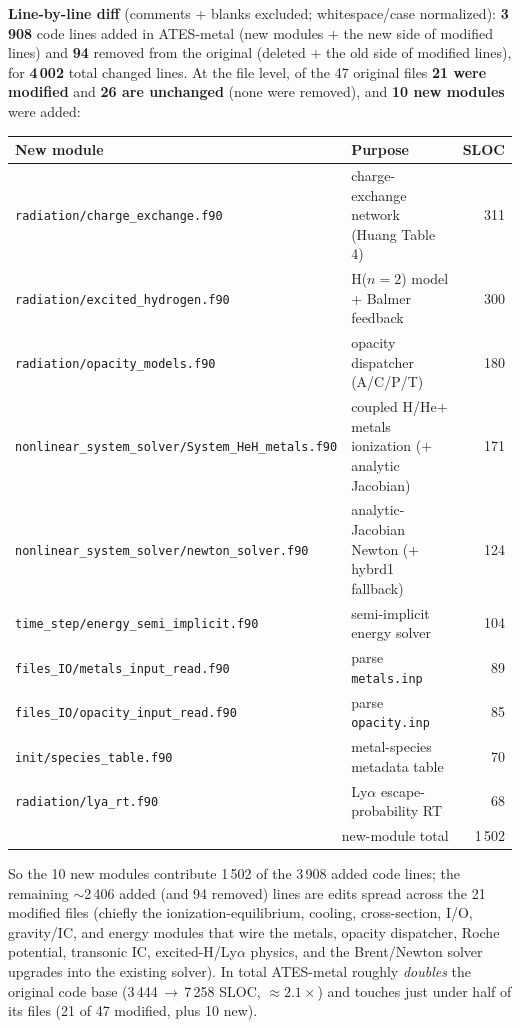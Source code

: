 \documentclass[english,a4paper]{kiseon_memo}
\begin{document}
\noindent
\textbf{Line-by-line diff} (comments + blanks excluded; whitespace/case normalized):
\textbf{3\,908} code lines added in ATES-metal (new modules + the new side of
modified lines) and \textbf{94} removed from the original (deleted + the old side of
modified lines), for \textbf{4\,002} total changed lines. At the file level, of the
47 original files \textbf{21 were modified} and \textbf{26 are unchanged} (none were
removed), and \textbf{10 new modules} were added:

\begin{center}\small
\begin{tabular}{@{}llr@{}}
\toprule
New module & Purpose & SLOC \\
\midrule
\texttt{radiation/charge\_exchange.f90}  & charge-exchange network (Huang Table 4) & 311 \\
\texttt{radiation/excited\_hydrogen.f90} & H($n{=}2$) model + Balmer feedback & 300 \\
\texttt{radiation/opacity\_models.f90}   & opacity dispatcher (A/C/P/T) & 180 \\
\texttt{nonlinear\_system\_solver/System\_HeH\_metals.f90} & coupled H/He$+$metals ionization ($+$analytic Jacobian) & 171 \\
\texttt{nonlinear\_system\_solver/newton\_solver.f90} & analytic-Jacobian Newton ($+$\,hybrd1 fallback) & 124 \\
\texttt{time\_step/energy\_semi\_implicit.f90} & semi-implicit energy solver & 104 \\
\texttt{files\_IO/metals\_input\_read.f90} & parse \texttt{metals.inp} & 89 \\
\texttt{files\_IO/opacity\_input\_read.f90} & parse \texttt{opacity.inp} & 85 \\
\texttt{init/species\_table.f90}          & metal-species metadata table & 70 \\
\texttt{radiation/lya\_rt.f90}            & Ly$\alpha$ escape-probability RT & 68 \\
\midrule
\multicolumn{2}{r}{new-module total} & 1\,502 \\
\bottomrule
\end{tabular}
\end{center}

\noindent
So the 10 new modules contribute 1\,502 of the 3\,908 added code lines; the
remaining $\sim$2\,406 added (and 94 removed) lines are edits spread across the 21
modified files (chiefly the ionization-equilibrium, cooling, cross-section, I/O,
gravity/IC, and energy modules that wire the metals, opacity dispatcher, Roche
potential, transonic IC, excited-H/Ly$\alpha$ physics, and the Brent/Newton solver
upgrades into the existing solver). In total ATES-metal roughly \emph{doubles} the
original code base (3\,444\,$\to$\,7\,258 SLOC, $\approx2.1\times$) and touches just
under half of its files (21 of 47 modified, plus 10 new).
\end{document}
